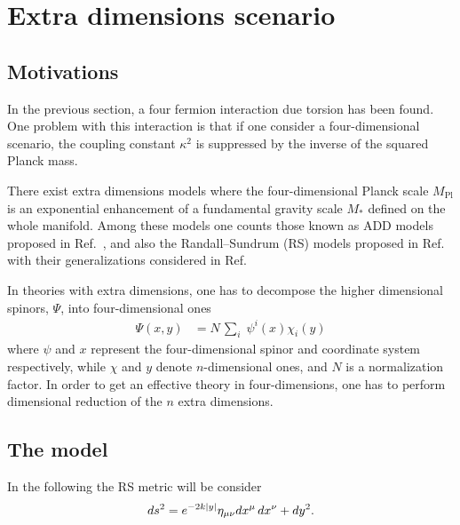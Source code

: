 \section{\label{sec:extradim}Extra dimensions scenario}


\subsection{Motivations}

In the previous section, a four fermion interaction due torsion has been found. One  problem with this interaction is that if one consider a four-dimensional scenario, the coupling constant $\kappa^2$ is suppressed by the inverse of the squared Planck mass. 

There exist extra dimensions models where the four-dimensional Planck scale $M_{\text{Pl}}$ is an exponential enhancement of a fundamental gravity scale $M_*$ defined on the whole manifold. Among these models one counts those known as %
ADD models proposed  in Ref.~\cite{ArkaniHamed:1998rs,Antoniadis:1998ig,ArkaniHamed:1998nn}, %
and also the  Randall--Sundrum (RS) models proposed in Ref.~\cite{Randall:1999ee,Randall:1999vf} %
with their generalizations  considered in Ref.~\cite{DeWolfe:1999cp,Gremm:1999pj,MPS,CastilloFelisola:2004eg}

In theories  with extra dimensions, one has to decompose the higher dimensional spinors, $\Psi$, into four-dimensional ones 
\begin{align}
  \label{spinordecomp}
  \Psi(x,y) &= N\,\sum_{i}\; \psi^{i}(x)\chi_{i}(y)
\end{align}
where $\psi$ and $x$ represent the four-dimensional spinor and coordinate system respectively, while $\chi$ and $y$ denote  $n$-dimensional ones, and $N$ is a normalization factor. In order to get an effective theory in four-dimensions, one has to perform dimensional reduction of the $n$ extra dimensions.

\subsection{The model}
In the following the  RS metric  will be consider~\cite{Randall:1999ee}
\begin{align}
  \label{RSmetric}
  ds^2 = e^{-2k\left|y\right|}\eta_{\mu\nu}dx^\mu\,dx^\nu + dy^2.
\end{align}

